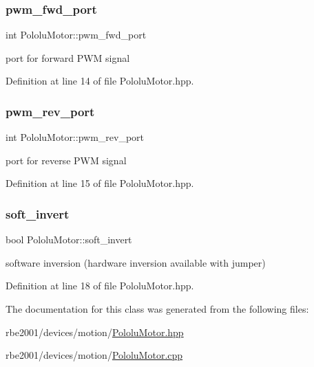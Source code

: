 \subsubsection{\texorpdfstring{pwm\+\_\+fwd\+\_\+port}{pwm\_fwd\_port}}
{\footnotesize\ttfamily int Pololu\+Motor\+::pwm\+\_\+fwd\+\_\+port\hspace{0.3cm}{\ttfamily [private]}}



port for forward P\+WM signal 



Definition at line 14 of file Pololu\+Motor.\+hpp.

\mbox{\label{class_pololu_motor_a6ad3e14d6c3e1c8806bce32f794d5ec9}} 
\subsubsection{\texorpdfstring{pwm\+\_\+rev\+\_\+port}{pwm\_rev\_port}}
{\footnotesize\ttfamily int Pololu\+Motor\+::pwm\+\_\+rev\+\_\+port\hspace{0.3cm}{\ttfamily [private]}}



port for reverse P\+WM signal 



Definition at line 15 of file Pololu\+Motor.\+hpp.

\mbox{\label{class_pololu_motor_af729e682597489cad35fd8a109ab9e5f}} 
\subsubsection{\texorpdfstring{soft\+\_\+invert}{soft\_invert}}
{\footnotesize\ttfamily bool Pololu\+Motor\+::soft\+\_\+invert\hspace{0.3cm}{\ttfamily [private]}}



software inversion (hardware inversion available with jumper) 



Definition at line 18 of file Pololu\+Motor.\+hpp.



The documentation for this class was generated from the following files\+:\begin{DoxyCompactItemize}
\item 
rbe2001/devices/motion/\hyperlink{_pololu_motor_8hpp}{Pololu\+Motor.\+hpp}\item 
rbe2001/devices/motion/\hyperlink{_pololu_motor_8cpp}{Pololu\+Motor.\+cpp}\end{DoxyCompactItemize}
